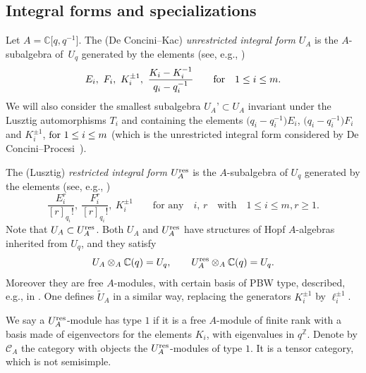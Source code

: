 \documentclass[pdftex]{sigma}%
\numberwithin{equation}{section}
\numberwithin{figure}{section}
\newcommand{\mz}{\mathbb{Z}}
\begin{document}
\subsection{Integral forms and specializations}

Let ${A}={\mathbb C}\big[q,q^{-1}\big]$. The (De Concini--Kac) {\it unrestricted integral form} $U_A$ is the $A$-subalgebra of~$U_q$ generated by the elements (see, e.g., \cite[Chapter~9.2]{CP})
\begin{equation*}%
E_i, \ F_i, \ K_i^{\pm 1}, \ \frac{K_i - K_i^{-1}}{q_i - q_i^{-1}}\qquad {\rm for\quad } 1\leq i\leq m.
\end{equation*}
We will also consider the smallest subalgebra $U_A’\subset U_A$ invariant
under the Lusztig automorphisms $T_i$ and containing the elements $\big(q_i-q_i^{-1}\big)E_i$, $\big(q_i-q_i^{-1}\big)F_i$ and $K_i^{\pm 1}$, ${\rm for\ } 1\leq i\leq m$ (which is the unrestricted integral form considered by De Concini--Procesi~\cite{DC-K-P2}).

The (Lusztig) {\it restricted integral form} $U_A^{\rm res}$ is the $A$-subalgebra of $U_q$ generated by the elements (see, e.g., \cite[Chapter~9.3]{CP})
\begin{equation*}%
\frac{E_i^r}{[r]_{q_i} !} , \ \frac{F_i^r}{[r]_{q_i} !} , \ K_i^{\pm 1} \qquad \text{for any} \quad i, \, r \quad \text{with} \quad 1\leq i\leq m, r\geq 1.
\end{equation*}
Note that $U_A\subset U_A^{\rm res}$. Both $U_A$ and $U_A^{\rm res}$ have structures of Hopf $A$-algebras inherited from $U_q$, and they satisfy
\[U_A\otimes _{A}{\mathbb C}(q)=U_q ,\qquad U_A^{\rm res}\otimes _{A}{\mathbb C}(q)=U_q.\]
Moreover they are free $A$-modules, with certain basis of PBW type, described, e.g., in \cite[Chapter~9]{CP}. One defines $\tilde U_A$ in a similar way, replacing the generators $K_i^{\pm 1}$ by $\ell_i^{\pm 1}$.

We say a $U_A^{\rm res}$-module has type $1$ if it is a free $A$-module of finite rank with a basis made of eigenvectors for the elements $K_i$, with eigenvalues in $q^{\mz}$.
Denote by ${\mathcal C}_A$ the category with objects the $U_A^{\rm res}$-modules of type $1$. It is a tensor category, which is not semisimple.
\end{document}
